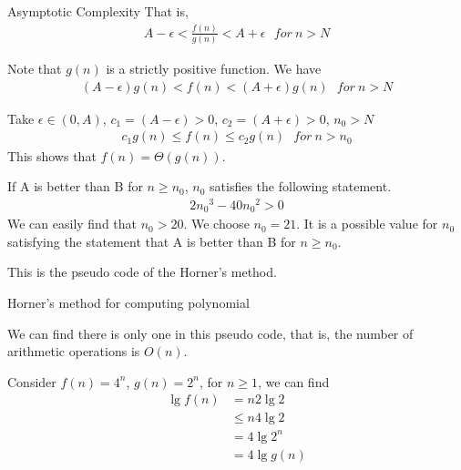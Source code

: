 \begin{homeworkProblem}{Asymptotic Complexity}
    That is,
    \[
        \begin{split}
            A - \epsilon < \frac{f(n)}{g(n)} < A + \epsilon ~~~for~n>N
        \end{split}
    \]

    Note that $g(n)$ is a strictly positive function. We have
    \[
        \begin{split}
            (A - \epsilon)g(n) < f(n) < (A + \epsilon)g(n) ~~~for~n>N
        \end{split}
    \]

    Take $\epsilon \in (0,A)$, $c_1 = (A - \epsilon) > 0$, $c_2 = (A + \epsilon) > 0$, $n_0 > N$
    \[
        \begin{split}
            c_1 g(n) \leq f(n) \leq c_2 g(n) ~~~for~n>n_0
        \end{split}
    \]
    This shows that $f(n) = \Theta(g(n))$.


    If A is better than B for $n \geq n_0$, $n_0$ satisfies the following statement.
    \[
        \begin{split}
            2{n_0}^3 - 40{n_0}^2 > 0
        \end{split}
    \]
    We can easily find that $n_0 > 20$. We choose $n_0 = 21$. It is a possible value for $n_0$ 
    satisfying the statement that A is better than B for $n \geq n_0$.
    
    
    This is the pseudo code of the Horner's method.
    \begin{algorithm}[]
        \begin{algorithmic}[1]
            \EndFor
            \EndFunction{}
        \end{algorithmic}
        \caption{Horner's method for computing polynomial}
    \end{algorithm}

    We can find there is only one  in this pseudo code, that is, the number of 
    arithmetic operations is $O(n)$.


    \pagebreak

    Consider $f(n) = 4^n$, $g(n) = 2^n$, for $n \geq 1$, we can find
    \[
        \begin{split}
            \lg f(n) &= n 2 \lg 2 
            \\
            &\leq n 4\lg 2 
            \\
            &= 4 \lg 2^n
            \\
            &= 4\lg g(n)
        \end{split}
    \]


\end{homeworkProblem}
